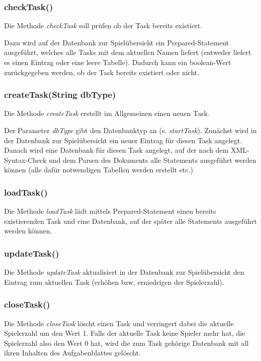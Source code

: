 \documentclass[11pt]{report}
\begin{document}
\subsubsection*{checkTask()}

Die Methode \textit{checkTask} soll prüfen ob der Task bereits existiert.

Dazu wird auf der Datenbank zur Spielübersicht ein Prepared-Statement ausgeführt, welches alle Tasks mit dem aktuellen Namen liefert (entweder liefert es einen Eintrag oder eine leere Tabelle). Dadurch kann ein boolean-Wert zurückgegeben werden, ob der Task bereits existiert oder nicht.


\subsubsection*{createTask(String dbType)}

Die Methode \textit{createTask} erstellt im Allgemeinen einen neuen Task. 

Der Parameter \textit{dbType} gibt den Datenbanktyp an (s. \textit{startTask}).
Zunächst wird in der Datenbank zur Spielübersicht ein neuer Eintrag für diesen Task angelegt. Danach wird eine Datenbank für diesen Task angelegt, auf der nach dem XML-Syntax-Check und dem Parsen des Dokuments alle Statements ausgeführt werden können (alle dafür notwendigen  Tabellen werden erstellt etc.)

\subsubsection*{loadTask()}

Die Methode \textit{loadTask} lädt mittels Prepared-Statement einen bereits existierenden Task und eine Datenbank, auf der später alle Statements ausgeführt werden können.

\subsubsection*{updateTask()}

Die Methode \textit{updateTask} aktualisiert in der Datenbank zur Spielübersicht den Eintrag zum aktuellen Task (erhöhen bzw. erniedrigen der Spielerzahl).

\subsubsection*{closeTask()}

Die Methode \textit{closeTask} löscht einen Task und verringert dabei die aktuelle Spielerzahl um den Wert 1. Falls der aktuelle Task keine Spieler mehr hat, die Spielerzahl also den Wert 0 hat, wird die zum Task gehörige Datenbank mit all ihren Inhalten des Aufgabenblattes gelöscht.
\end{document}
